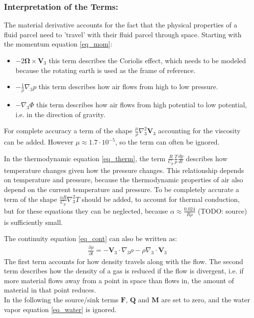 \subsubsection{Interpretation of the Terms:}
The material derivative accounts for the fact that the physical properties of a fluid parcel need to 'travel' with their fluid parcel through space.
Starting with the momentum equation \ref{eq_mom}:
\begin{itemize}
\item $-2\boldsymbol{\Omega}\times \textbf{V}_3$ this term describes the Coriolis effect, which needs to be modeled because the rotating earth is used as the frame of reference.
\item $- \frac{1}{\rho}\nabla _3 p$ this term describes how air flows from high to low pressure.
\item $- \nabla _3 \Phi$ this term describes how air flows from high potential to low potential, i.e. in the direction of gravity.
\end{itemize}
For complete accuracy a term of the shape $\frac{\mu}{\rho} \nabla _3^2 \textbf{V}_3$ accounting for the viscosity can be added.
However $\mu \approx 1.7\cdot 10^{-5}$, so the term can often be ignored.

In the thermodynamic equation \ref{eq_therm}, the term $\frac{R}{C_p}\frac{T}{p}\frac{dp}{dt}$ describes how temperature changes given how the pressure changes.
This relationship depends on temperature and pressure, because the thermodynamic properties of air also depend on the current temperature and pressure.
To be completely accurate a term of the shape $\frac{\alpha R}{C_p}\nabla _3^2 T$ should be added, to account for thermal conduction, but for these equations they can be neglected, because $\alpha \approx \frac{0.024}{R\rho}$ (TODO: source) is sufficiently small.

The continuity equation \ref{eq_cont} can also be written as:
\begin{align*}
\frac{\partial \rho}{\partial t} =  - \textbf{V}_3 \cdot \nabla _3 \rho -\rho \nabla _3 \cdot \textbf{V}_3 
\end{align*}
The first term accounts for how density travels along with the flow.
The second term describes how the density of a gas is reduced if the flow is divergent, i.e. if more material flows away from a point in space than flows in, the amount of material in that point reduces.\\
In the following the source/sink terms $\textbf{F}$, $\textbf{Q}$ and $\textbf{M}$ are set to zero, and the water vapor equation \ref{eq_water} is ignored.


